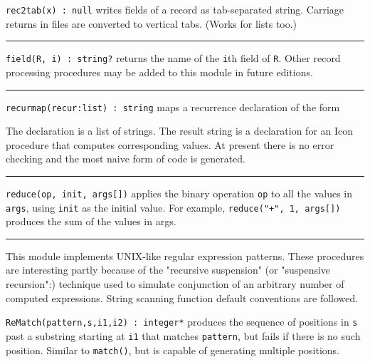 \texttt{rec2tab(x) : null} writes fields of a record as tab-separated
string. Carriage returns in files are converted to vertical tabs.
(Works for lists too.) \ 

\vspace{0.25cm}\hrule{}

\texttt{field(R, i) : string?} returns the name of the \texttt{i}th
field of \texttt{R}. Other record processing procedures may be added to
this module in future editions. 

\vspace{0.25cm}\hrule{}

\texttt{recurmap(recur:list) : string} maps a recurrence declaration of
the form

The declaration is a list of strings. The result string is a
declaration for an Icon procedure that computes corresponding values.
At present there is no error checking and the most naive form of code
is generated. 

\vspace{0.25cm}\hrule{}

\texttt{reduce(op, init, args[])} applies the binary
operation \texttt{op} to all the values in \texttt{args}, using
\texttt{init} as the initial value. For example,
\texttt{reduce("+", 1, args[])} produces
the sum of the values in args. 

\vspace{0.25cm}\hrule{}

This module implements UNIX-like regular
expression patterns. These procedures are interesting partly because of
the "recursive suspension" (or
"suspensive recursion":)
technique used to simulate conjunction of an arbitrary number of
computed expressions. String scanning function
default conventions are followed.

\texttt{ReMatch(pattern,s,i1,i2) : integer*} produces the sequence of
positions in \texttt{s} past a substring starting at \texttt{i1} that
matches \texttt{pattern}, but fails if there is no such position.
Similar to \texttt{match()}, but is capable of generating multiple
positions.

